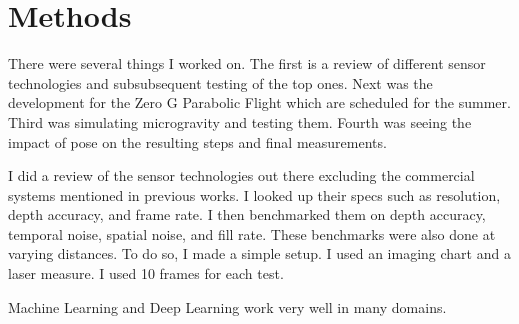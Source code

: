 \chapter{Methods}
There were several things I worked on. The first is a review of different sensor technologies and subsubsequent testing of the top ones. Next was the development for the Zero G Parabolic Flight which are scheduled for the summer. Third was simulating microgravity and testing them. Fourth was seeing the impact of pose on the resulting steps and final measurements.

I did a review of the sensor technologies out there excluding the commercial systems mentioned in previous works. I looked up their specs such as resolution, depth accuracy, and frame rate. I then benchmarked them on depth accuracy, temporal noise, spatial noise, and fill rate. These benchmarks were also done at varying distances. To do so, I made a simple setup. I used an imaging chart and a laser measure. I used 10 frames for each test. 

Machine Learning and Deep Learning work very well in many domains. 

